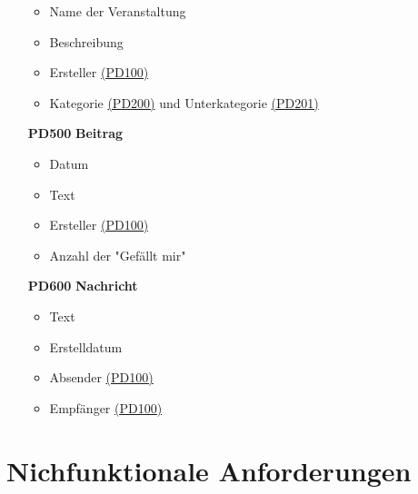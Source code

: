 \documentclass[parskip=full]{scrartcl}
\begin{document}
\begin{itemize}
			\begin{itemize}[nosep]
				\item Name der Veranstaltung
				\item Beschreibung
				\item Ersteller \hyperref[sec:PD100]{(PD100)}
				\item Kategorie \hyperref[sec:P200]{(PD200)} und Unterkategorie \hyperref[sec:PD201]{(PD201)}
			\end{itemize}
		\item[\textbf{PD500}] \textbf{Beitrag} \label{sec:PD500}
			\begin{itemize}[nosep]
				\item Datum
				\item Text
				\item Ersteller \hyperref[sec:PD100]{(PD100)}
				\item Anzahl der "Gefällt mir"
			\end{itemize}
		\item[\textbf{PD600}] \textbf{Nachricht} \label{sec:PD600}
			\begin{itemize}[nosep]
				\item Text
				\item Erstelldatum
				\item Absender \hyperref[sec:PD100]{(PD100)}
				\item Empfänger \hyperref[sec:PD100]{(PD100)}	
			\end{itemize}
	\end{itemize}
	
	\newpage
	\section{Nichfunktionale Anforderungen}
			
\end{document}
